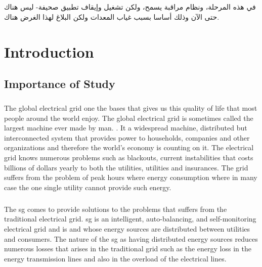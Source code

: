 \documentclass[oneside,12pt,a4paper,final]{book}
\begin{document}
\paragraph{}
\begin{arabtex}

في هذه المرحلة، ونظام مراقبة يسمح، ولكن تشغيل وإيقاف تطبيق صحيفة-
 ليس هناك حتى الآن وذلك أساسا بسبب غياب المعدات ولكن البلاغ لهذا الغرض هناك.
\end{arabtex}

\singlespacing

\tableofcontents
\listoffigures
\listoftables
\printglossaries

\mainmatter
\doublespacing
\chapter{Introduction}

\section{Importance of Study}
\paragraph{}
The global electrical grid one the bases that gives us this quality of life that most people around the world enjoy. The global electrical grid is sometimes called the largest machine ever made by man. \cite{ref1}. It a widespread machine, distributed but interconnected system that provides power to households, companies and other organizations and therefore the world's economy is counting on it. The electrical grid knows numerous problems such as blackouts, current instabilities that costs billions of dollars yearly to both the utilities, utilities and insurances. The grid suffers from the problem of peak hours where energy consumption where in many case the one single utility cannot provide such energy.
\paragraph{}
The \gls{sg} comes to provide solutions to the problems that suffers from the traditional electrical grid. \gls{sg} is an intelligent, auto-balancing, and self-monitoring electrical grid \cite{ref2} and is and whose energy sources are distributed between utilities and consumers. The nature of the \gls{sg} as having distributed energy sources reduces numerous losses that arises in the traditional grid such as the energy loss in the energy transmission lines and also in the overload of the electrical lines.
\end{document}
